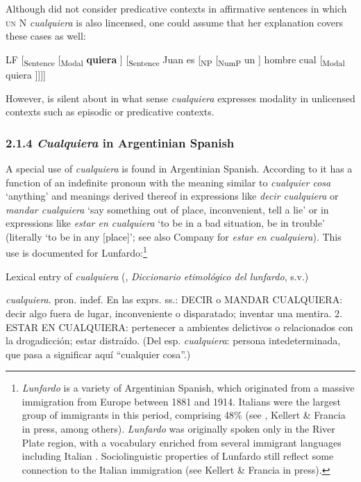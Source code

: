 \documentclass[output=paper]{langscibook}
\begin{document}
Although \citet{Rivero2011} did not consider predicative contexts in affirmative sentences in which \textsc{un} N \textit{cualquiera} is also lincensed, one could assume that her explanation covers these cases as well:

  LF [\textsubscript{Sentence} [\textsubscript{Modal} \textbf{quiera} ] [\textsubscript{Sentence} Juan es [\textsubscript{NP} [\textsubscript{NumP} un ] hombre cual [\textsubscript{Modal} quiera ]]]]

However, \citet{Rivero2011} is silent about in what sense \textit{cualquiera} expresses modality in unlicensed contexts such as episodic or predicative contexts.

\subsubsection{\textbf{2.1.4} \textbf{\textit{Cualquiera}} \textbf{in} \textbf{Argentinian} \textbf{Spanish}}

A special use of \textit{cualquiera} is found in Argentinian Spanish. According to \citet{Conde2011} it has a function of an indefinite pronoun with the meaning similar to \textit{cualquier cosa} ‘anything’ and meanings derived thereof in expressions like \textit{decir cualquiera} or \textit{mandar cualquiera} ‘say something out of place, inconvenient, tell a lie’ or in expressions like \textit{estar en cualquiera} ‘to be in a bad situation, be in trouble’ (literally ‘to be in any [place]’; see also Company \citealt{Company2009} for \textit{estar en cualquiera}). This use is documented for Lunfardo:\footnote{ \textrm{\textit{Lunfardo}} \textrm{is a variety of Argentinian Spanish, which originated from a massive immigration from Europe between 1881 and 1914. Italians were the largest group of immigrants in this period, comprising 48\% (see \citealt{Devoto2002}, Kellert \& Francia in press, among others).} \textrm{\textit{Lunfardo}} \textrm{was originally spoken only in the River Plate region, with a vocabulary enriched from several immigrant languages including Italian \citep{Conde2011}. Sociolinguistic properties of Lunfardo still reflect some connection to the Italian immigration (see Kellert \& Francia in press).}}

  Lexical entry of \textit{cualquiera} (\citealt{Conde2011}, \textit{Diccionario etimológico del lunfardo}, s.v.)

  \textit{cualquiera}. pron. indef. En las exprs. ss.: DECIR o MANDAR CUALQUIERA: decir algo fuera de lugar, inconveniente o disparatado; inventar una mentira. {\textbar} 2. ESTAR EN CUALQUIERA: pertenecer a ambientes delictivos o relacionados con la drogadicción; estar distraído. (Del esp. \textit{cualquiera}: persona intedeterminada, que pasa a significar aquí “cualquier cosa”.) 
\end{document}
